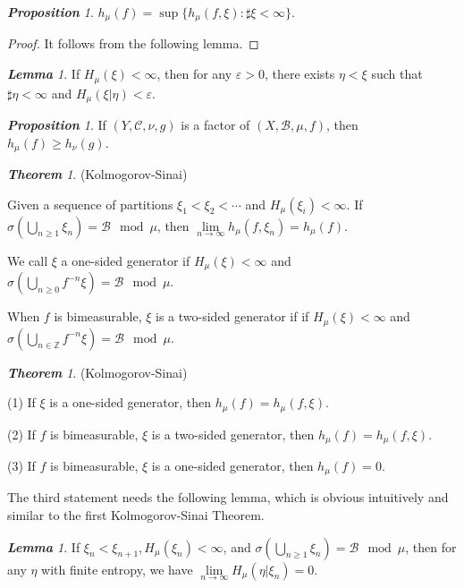 \documentclass[10pt, a4paper, oneside]{report}
\numberwithin{equation}{chapter}
\theoremstyle{remark}
\newtheorem{theorem}[definition]{\bf{Theorem}}
\newtheorem{lemma}[definition]{\bf{Lemma}}
\newtheorem{proposition}[definition]{\bf{Proposition}}
\theoremstyle{remark}
\begin{document}
\begin{proposition}
    $h_\mu(f)=\sup\{h_\mu(f,\xi):\sharp\xi<\infty\}.$
\end{proposition}

\begin{proof}
    It follows from the following lemma.
\end{proof}

\begin{lemma}
    If $H_\mu(\xi)<\infty$, then for any $\varepsilon>0$, there exists $\eta<\xi$ such that $\sharp\eta<\infty$ and $H_\mu(\xi|\eta)<\varepsilon.$
\end{lemma}

\begin{proposition}
    If $(Y,\mathcal{C},\nu,g)$ is a factor of $(X,\mathcal{B},\mu,f)$, then $h_\mu(f)\geqslant h_\nu(g)$.
\end{proposition}

\begin{theorem}
(Kolmogorov-Sinai)

    Given a sequence of partitions $\xi_1<\xi_2<\cdots$ and $H_\mu(\xi_i)<\infty$. If $\sigma(\bigcup\limits_{n\geqslant 1}\xi_n)=\mathcal{B}\mod\mu$, then $\lim\limits_{n\to\infty}h_\mu(f,\xi_n)=h_\mu(f).$
\end{theorem}

We call $\xi$ a one-sided generator if $H_\mu(\xi)<\infty$ and $\sigma(\bigcup\limits_{n\geqslant 0}f^{-n}\xi)=\mathcal{B}\mod\mu$.

When $f$ is bimeasurable, $\xi$ is a two-sided generator if if $H_\mu(\xi)<\infty$ and $\sigma(\bigcup\limits_{n\in\mathbb{Z}}f^{-n}\xi)=\mathcal{B}\mod\mu$.

\begin{theorem}
(Kolmogorov-Sinai)

    (1) If $\xi$ is a one-sided generator, then $h_\mu(f)=h_\mu(f,\xi)$.

    (2) If $f$ is bimeasurable, $\xi$ is a two-sided generator, then $h_\mu(f)=h_\mu(f,\xi)$.

    (3) If $f$ is bimeasurable, $\xi$ is a one-sided generator, then $h_\mu(f)=0$.
\end{theorem}

The third statement needs the following lemma, which is obvious intuitively and similar to the first Kolmogorov-Sinai Theorem.

\begin{lemma}
    If $\xi_n<\xi_{n+1},H_\mu(\xi_n)<\infty$, and $\sigma(\bigcup\limits_{n\geqslant 1}\xi_n)=\mathcal{B}\mod\mu$, then for any $\eta$ with finite entropy, we have $\lim\limits_{n\to\infty}H_\mu(\eta|\xi_n)=0.$
\end{lemma}
\end{document}
